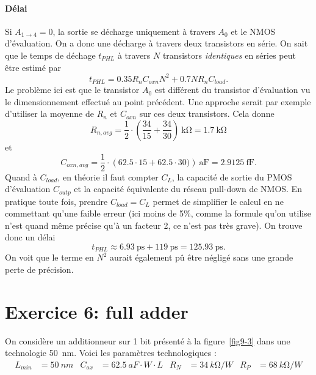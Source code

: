 \documentclass[frenchb,DIV=14]{scrartcl}
\begin{document}
\paragraph{Délai}
Si $A_{1\to4} = 0$, la sortie se décharge uniquement à travers $A_0$
et le NMOS d'évaluation. On a donc une décharge à travers deux transistors
en série. On sait que le temps de déchage $t_{PHL}$ à travers $N$
transistors \emph{identiques} en séries peut être estimé par
\[ t_{PHL} = 0.35R_nC_{oxn}N^2 + 0.7NR_nC_{load}. \]
Le problème ici est que le transistor $A_0$ est différent du transistor
d'évaluation vu le dimensionnement effectué au point précédent.
Une approche serait par exemple d'utiliser la moyenne de $R_n$ et $C_{oxn}$
sur ces deux transistors. Cela donne
\[ R_{n,avg} = \frac{1}{2} \cdot \left(\frac{34}{15} + \frac{34}{30}\right)\SI{}{\kilo\ohm}
= \SI{1.7}{\kilo\ohm} \]
et
\[ C_{oxn,avg} = \frac{1}{2} \cdot \left(62.5\cdot 15 + 62.5\cdot 30)\right)\SI{}{\atto\farad}
= \SI{2.9125}{\femto\farad}. \]
Quand à $C_{load}$, en théorie il faut compter $C_L$, la capacité de sortie
du PMOS d'évaluation $C_{outp}$ et la capacité équivalente du réseau pull-down
de NMOS. En pratique toute fois, prendre $C_{load} = C_L$ permet de simplifier
le calcul en ne commettant qu'une faible erreur (ici moins de 5\%, comme
la formule qu'on utilise n'est quand même précise qu'à un facteur 2, ce n'est
pas très grave). On trouve donc un délai 
\[ t_{PHL} \approx \SI{6.93}{\pico\second} + \SI{119}{\pico\second} =
\SI{125.93}{\pico\second}. \]
On voit que le terme en $N^2$ aurait également pû être négligé sans une grande
perte de précision.

\clearpage
\section*{Exercice 6: full adder}

On considère un additionneur sur 1 bit présenté à la figure~\ref{fig9-3} dans
une technologie \SI{50}{nm}. Voici les paramètres technologiques :
\begin{align*}
    L_{min} &= \SI{50}{nm} &
    C_{ox} &= \SI{62.5}{aF}\cdot W\cdot L &
    R_N&=\SI{34}{k\ohm}/W &
    R_P&=\SI{68}{k\ohm}/W 
\end{align*}
\end{document}
